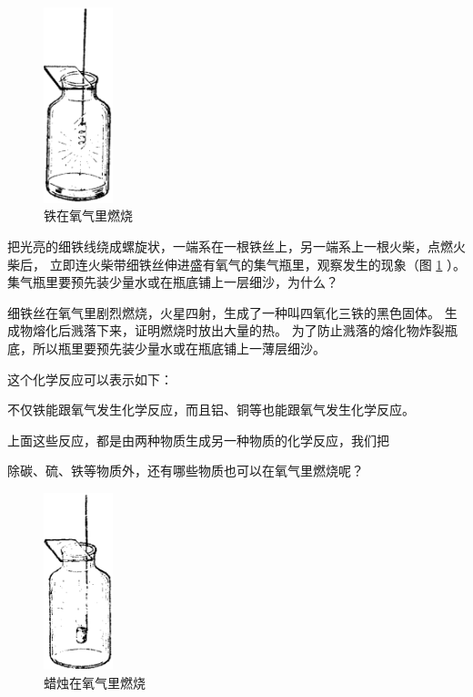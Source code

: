 \begin{figure}
    \centering
    \includegraphics[width=2cm]{../pic/czhx1-ch1-5}
    \caption{铁在氧气里燃烧}\label{fig:1-5}
\end{figure}

\wrapfiguretrick


\begin{shiyan}
    把光亮的细铁线绕成螺旋状，一端系在一根铁丝上，另一端系上一根火柴，点燃火柴后，
    立即连火柴带细铁丝伸进盛有氧气的集气瓶里，观察发生的现象（图 \ref{fig:1-5} ）。
    集气瓶里要预先装少量水或在瓶底铺上一层细沙，为什么？

\end{shiyan}

细铁丝在氧气里剧烈燃烧，火星四射，生成了一种叫四氧化三铁的黑色固体。
生成物熔化后溅落下来，证明燃烧时放出大量的热。
为了防止溅落的熔化物炸裂瓶底，所以瓶里要预先装少量水或在瓶底铺上一薄层细沙。

这个化学反应可以表示如下：
\begin{fangchengshi}
\end{fangchengshi}

不仅铁能跟氧气发生化学反应，而且铝、铜等也能跟氧气发生化学反应。

上面这些反应，都是由两种物质生成另一种物质的化学反应，我们把


除碳、硫、铁等物质外，还有哪些物质也可以在氧气里燃烧呢？

\begin{figure}
    \centering
    \includegraphics[width=2cm]{../pic/czhx1-ch1-6}
    \caption{蜡烛在氧气里燃烧}\label{fig:1-6}
\end{figure}

